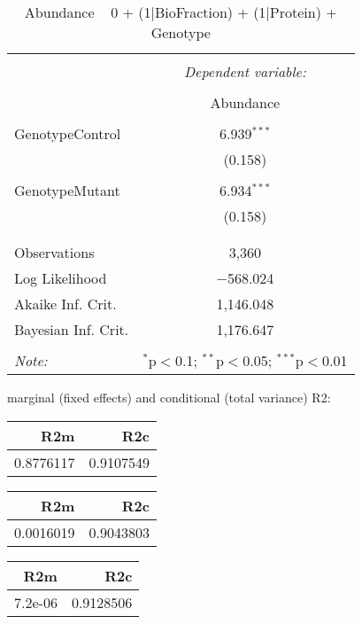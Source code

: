 \documentclass[11pt]{report}
\begin{document}
\begin{table}[!htbp] \centering 
  \caption{Abundance ~ 0 + (1|BioFraction) + (1|Protein) + Genotype} 
  \label{} 
\begin{tabular}{@{\extracolsep{5pt}}lc} 
\\[-1.8ex]\hline 
\hline \\[-1.8ex] 
 & \multicolumn{1}{c}{\textit{Dependent variable:}} \\ 
\cline{2-2} 
\\[-1.8ex] & Abundance \\ 
\hline \\[-1.8ex] 
 GenotypeControl & 6.939$^{***}$ \\ 
  & (0.158) \\ 
  & \\ 
 GenotypeMutant & 6.934$^{***}$ \\ 
  & (0.158) \\ 
  & \\ 
\hline \\[-1.8ex] 
Observations & 3,360 \\ 
Log Likelihood & $-$568.024 \\ 
Akaike Inf. Crit. & 1,146.048 \\ 
Bayesian Inf. Crit. & 1,176.647 \\ 
\hline 
\hline \\[-1.8ex] 
\textit{Note:}  & \multicolumn{1}{r}{$^{*}$p$<$0.1; $^{**}$p$<$0.05; $^{***}$p$<$0.01} \\ 
\end{tabular} 
\end{table} 
marginal (fixed effects) and conditional (total variance) R2:

\begin{tabular}{r|r}
\hline
R2m & R2c\\
\hline
0.8776117 & 0.9107549\\
\hline
\end{tabular}

\begin{tabular}{r|r}
\hline
R2m & R2c\\
\hline
0.0016019 & 0.9043803\\
\hline
\end{tabular}

\begin{tabular}{r|r}
\hline
R2m & R2c\\
\hline
7.2e-06 & 0.9128506\\
\hline
\end{tabular}
\end{document}
